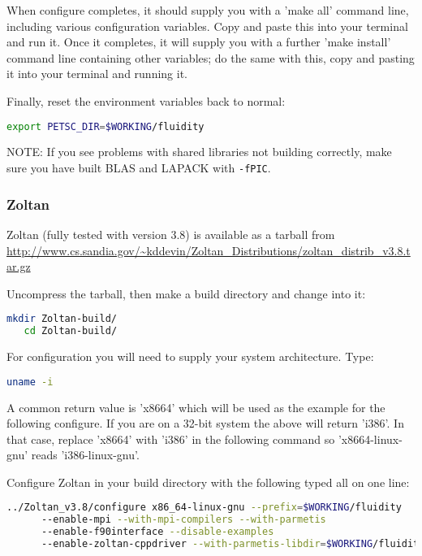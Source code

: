 When configure completes, it should supply you with a 'make all' command line,
including various configuration variables. Copy and paste this into your
terminal and run it. Once it completes, it will supply you with a further 'make
install' command line containing other variables; do the same with this, copy
and pasting it into your terminal and running it.

Finally, reset the environment variables back to normal:

\begin{lstlisting}[language=bash]
export PETSC_DIR=$WORKING/fluidity
\end{lstlisting}

NOTE: If you see problems with shared libraries not building correctly, make
sure you have built BLAS and LAPACK with \lstinline[language=bash]+-fPIC+.

\subsubsection{Zoltan}
\label{sec:required_libraries_numerical_zoltan}

Zoltan (fully tested with version 3.8) is available as a tarball from
\url{http://www.cs.sandia.gov/~kddevin/Zoltan_Distributions/zoltan_distrib_v3.8.tar.gz}

Uncompress the tarball, then make a build directory and change into it:

\begin{lstlisting}[language=bash]
   mkdir Zoltan-build/
   cd Zoltan-build/
\end{lstlisting}

For configuration you will need to supply your system architecture. Type:

\begin{lstlisting}[language=bash]
   uname -i
\end{lstlisting}

A common return value is 'x86{\textunderscore}64' which will be used as the
example for the following configure. If you are on a 32-bit system the above
will return 'i386'. In that case, replace 'x86{\textunderscore}64' with 'i386' in
the following command so 'x86{\textunderscore}64-linux-gnu' reads
'i386-linux-gnu'.

Configure Zoltan in your build directory with the following typed all on one
line:

\begin{lstlisting}[language=bash]
   ../Zoltan_v3.8/configure x86_64-linux-gnu --prefix=$WORKING/fluidity
      --enable-mpi --with-mpi-compilers --with-parmetis
      --enable-f90interface --disable-examples
      --enable-zoltan-cppdriver --with-parmetis-libdir=$WORKING/fluidity/lib
\end{lstlisting}

